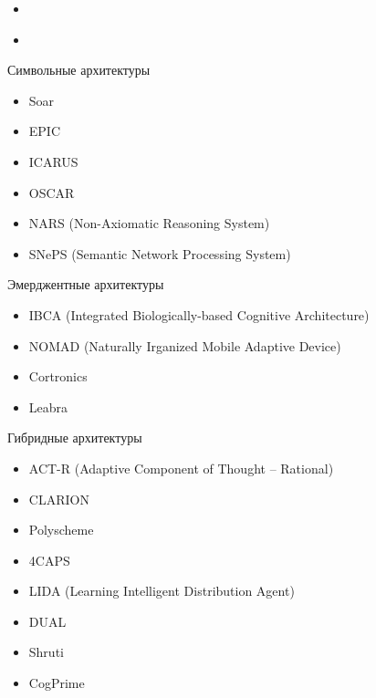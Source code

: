 \documentclass{beamer}
\begin{document}
\begin{frame}{}
\begin{itemize}
	\item 
	\medskip
\end{itemize}
\end{frame}

\begin{frame}{}
\begin{itemize}
	\item 
	\medskip
\end{itemize}
\end{frame}

\begin{frame}{Символьные архитектуры}
\begin{itemize}
	\item Soar
	\item EPIC
	\item ICARUS
	\item OSCAR
	\item NARS (Non-Axiomatic Reasoning System)
	\item SNePS (Semantic Network Processing System)
\end{itemize}
\end{frame}

\begin{frame}{Эмерджентные архитектуры}
\begin{itemize}
	\item IBCA (Integrated Biologically-based Cognitive Architecture)
	\item NOMAD (Naturally Irganized Mobile Adaptive Device)
	\item Cortronics
	\item Leabra
\end{itemize}
\end{frame}

\begin{frame}{Гибридные архитектуры}
\begin{itemize}
	\item ACT-R (Adaptive Component of Thought -- Rational)
	\item CLARION
	\item Polyscheme
	\item 4CAPS
	\item LIDA (Learning Intelligent Distribution Agent)
	\item DUAL
	\item Shruti
	\item CogPrime
\end{itemize}
\end{frame}
\end{document}
